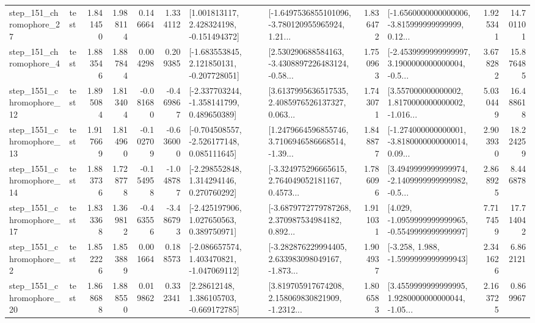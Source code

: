 \begin{tabular}{llrrrrllrlrr}
  step\_151\_chromophore\_27 &      test &      1.841450 &    1.988114 &      0.146664 &  1.334112 &    [1.001813117, 2.428324198, -0.151494372] &  [-1.6497536855101096, -3.780120955965924, 1.21... &       1.836472 &  [-1.6560000000000006, -3.815999999999999, 0.12... &            1.925341 &         14.701101 \\
   step\_151\_chromophore\_4 &      test &      1.883546 &    1.887844 &      0.004298 &  0.209385 &   [-1.683553845, 2.121850131, -0.207728051] &  [2.530290688584163, -3.4308897226483124, -0.58... &       1.750963 &  [-2.4539999999999997, 3.1900000000000004, -0.5... &            3.678282 &         15.876485 \\
 step\_1551\_chromophore\_12 &      test &      1.895084 &    1.813404 &     -0.081680 & -0.469867 &   [-2.337703244, -1.358141799, 0.489650389] &  [3.6137995636517535, 2.4085976526137327, 0.063... &       1.743071 &  [3.557000000000002, 1.8170000000000002, -1.016... &            5.030449 &         16.488618 \\
 step\_1551\_chromophore\_13 &      test &      1.917669 &    1.814960 &     -0.102709 & -0.636000 &   [-0.704508557, -2.526177148, 0.085111645] &  [1.2479664596855746, 3.7106946586668514, -1.39... &       1.848877 &  [-1.274000000000001, -3.8180000000000014, 0.09... &            2.903930 &         18.224259 \\
 step\_1551\_chromophore\_14 &      test &      1.883736 &    1.728778 &     -0.154958 & -1.048787 &    [-2.298552848, 1.314294146, 0.270760292] &  [-3.324975296665615, 2.764049052181167, 0.4573... &       1.786096 &  [3.4949999999999974, -2.1409999999999982, -0.5... &            2.868925 &          8.446878 \\
 step\_1551\_chromophore\_17 &      test &      1.833368 &    1.369812 &     -0.463556 & -3.486793 &    [-2.425197906, 1.027650563, 0.389750971] &  [-3.6879772779787268, 2.370987534984182, 0.892... &       1.911031 &  [4.029, -1.0959999999999965, -0.5549999999999997] &            7.717459 &         17.714042 \\
  step\_1551\_chromophore\_2 &      test &      1.852226 &    1.853889 &      0.001664 &  0.188573 &   [-2.086657574, 1.403470821, -1.047069112] &  [-3.282876229994405, 2.633983098049167, -1.873... &       1.904937 &               [-3.258, 1.988, -1.5999999999999943] &            2.341626 &          6.862121 \\
 step\_1551\_chromophore\_20 &      test &      1.868688 &    1.888550 &      0.019862 &  0.332341 &     [2.28612148, 1.386105703, -0.669172785] &  [3.819705917674208, 2.158069830821909, -1.2312... &       1.806583 &  [3.4559999999999995, 1.9280000000000044, -1.05... &            2.163725 &          0.869967 \\

\end{tabular}
